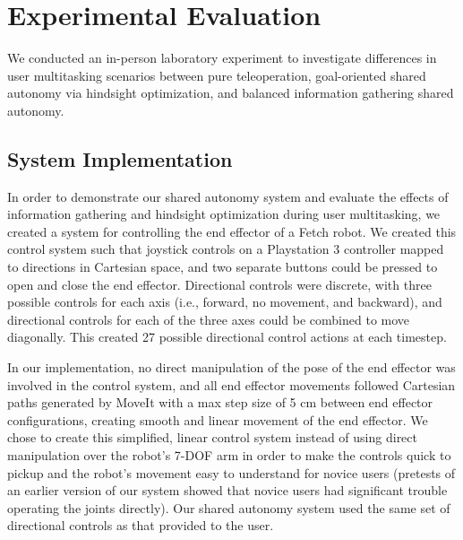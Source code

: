 \documentclass[conference]{IEEEtran}
\begin{document}
\section{Experimental Evaluation}

We conducted an in-person laboratory experiment to investigate differences in user multitasking scenarios between pure teleoperation, goal-oriented shared autonomy via hindsight optimization, and balanced information gathering shared autonomy.

\subsection{System Implementation}\label{implementation}
In order to demonstrate our shared autonomy system and evaluate the effects of information gathering and hindsight optimization during user multitasking, we created a system for controlling the end effector of a Fetch robot. We created this control system such that joystick controls on a Playstation 3 controller mapped to directions in Cartesian space, and two separate buttons could be pressed to open and close the end effector. Directional controls were discrete, with three possible controls for each axis (i.e., forward, no movement, and backward), and directional controls for each of the three axes could be combined to move diagonally. This created 27 possible directional control actions at each timestep.

In our implementation, no direct manipulation of the pose of the end effector was involved in the control system, and all end effector movements followed Cartesian paths generated by MoveIt \cite{sucan2013moveit} with a max step size of 5 cm between end effector configurations, creating smooth and linear movement of the end effector. We chose to create this simplified, linear control system instead of using direct manipulation over the robot's 7-DOF arm in order to make the controls quick to pickup and the robot's movement easy to understand for novice users (pretests of an earlier version of our system showed that novice users had significant trouble operating the joints directly). Our shared autonomy system used the same set of directional controls as that provided to the user.
\end{document}
